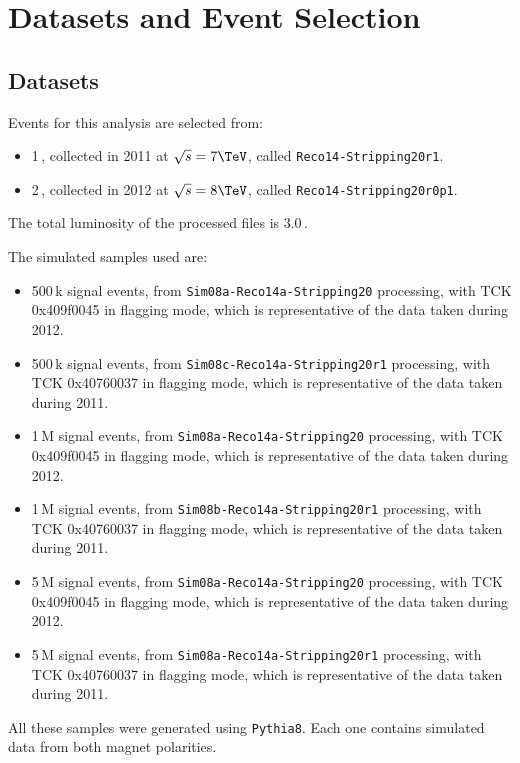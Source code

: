 
\chapter{Datasets and Event Selection}
\label{AppendixC}

\section{Datasets}
Events for this analysis are selected from:
\begin{itemize}

\item 1\,\invfb, collected in 2011 at $\sqrt{s}=7\TeV$, called \texttt{Reco14-Stripping20r1}.
\item 2\,\invfb, collected in 2012 at $\sqrt{s}=8\TeV$, called \texttt{Reco14-Stripping20r0p1}.

\end{itemize}
The total luminosity of the processed files is 3.0\,\invfb.

The simulated samples used are:

\begin{itemize}

\item %
500\,k \BsJpsiKst signal events, from \texttt{Sim08a-Reco14a-Stripping20} processing, with TCK 0x409f0045 in flagging mode, which is representative of the data taken during 2012.  

\item %
500\,k \BsJpsiKst signal events, from \texttt{Sim08c-Reco14a-Stripping20r1} processing, with TCK 0x40760037 in flagging mode, which is representative of the data taken during 2011.  

\item %
1\,M \BdJpsiKst signal events, from \texttt{Sim08a-Reco14a-Stripping20} processing, with TCK 0x409f0045 in flagging mode, which is representative of the data taken during 2012.  

\item %
1\,M \BdJpsiKst signal events, from \texttt{Sim08b-Reco14a-Stripping20r1} processing, with TCK 0x40760037 in flagging mode, which is representative of the data taken during 2011.    

\item %
5\,M \BsJpsiPhi signal events, from \texttt{Sim08a-Reco14a-Stripping20} processing, with TCK 0x409f0045 in flagging mode, which is representative of the data taken during 2012.  

\item %
5\,M \BsJpsiPhi signal events, from \texttt{Sim08a-Reco14a-Stripping20r1} processing, with TCK 0x40760037 in flagging mode, which is representative of the data taken during 2011.

\end{itemize}
All these samples were generated using \texttt{Pythia8}. Each one contains simulated data from both magnet polarities.



